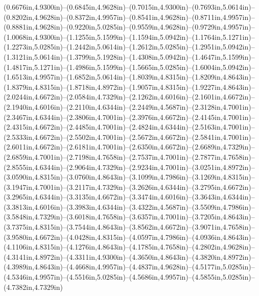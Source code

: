 (0.6676in,4.9300in)--(0.6845in,4.9628in)--(0.7015in,4.9300in)--(0.7693in,5.0614in)--(0.8202in,4.9628in)--(0.8372in,4.9957in)--(0.8541in,4.9628in)--(0.8711in,4.9957in)--(0.8881in,4.9628in)--(0.9220in,5.0285in)--(0.9559in,4.9628in)--(0.9729in,4.9957in)--(1.0068in,4.9300in)--(1.1255in,5.1599in)--(1.1594in,5.0942in)--(1.1764in,5.1271in)--(1.2273in,5.0285in)--(1.2442in,5.0614in)--(1.2612in,5.0285in)--(1.2951in,5.0942in)--(1.3121in,5.0614in)--(1.3799in,5.1928in)--(1.4308in,5.0942in)--(1.4647in,5.1599in)--(1.4817in,5.1271in)--(1.4986in,5.1599in)--(1.5665in,5.0285in)--(1.6004in,5.0942in)--(1.6513in,4.9957in)--(1.6852in,5.0614in)--(1.8039in,4.8315in)--(1.8209in,4.8643in)--(1.8379in,4.8315in)--(1.8718in,4.8972in)--(1.9057in,4.8315in)--(1.9227in,4.8643in)--(2.0244in,4.6672in)--(2.0584in,4.7329in)--(2.1262in,4.6016in)--(2.1601in,4.6672in)--(2.1940in,4.6016in)--(2.2110in,4.6344in)--(2.2449in,4.5687in)--(2.3128in,4.7001in)--(2.3467in,4.6344in)--(2.3806in,4.7001in)--(2.3976in,4.6672in)--(2.4145in,4.7001in)--(2.4315in,4.6672in)--(2.4485in,4.7001in)--(2.4824in,4.6344in)--(2.5163in,4.7001in)--(2.5333in,4.6672in)--(2.5502in,4.7001in)--(2.5672in,4.6672in)--(2.5841in,4.7001in)--(2.6011in,4.6672in)--(2.6181in,4.7001in)--(2.6350in,4.6672in)--(2.6689in,4.7329in)--(2.6859in,4.7001in)--(2.7198in,4.7658in)--(2.7537in,4.7001in)--(2.7877in,4.7658in)--(2.8555in,4.6344in)--(2.9064in,4.7329in)--(2.9234in,4.7001in)--(3.0251in,4.8972in)--(3.0590in,4.8315in)--(3.0760in,4.8643in)--(3.1099in,4.7986in)--(3.1269in,4.8315in)--(3.1947in,4.7001in)--(3.2117in,4.7329in)--(3.2626in,4.6344in)--(3.2795in,4.6672in)--(3.2965in,4.6344in)--(3.3135in,4.6672in)--(3.3474in,4.6016in)--(3.3643in,4.6344in)--(3.3813in,4.6016in)--(3.3983in,4.6344in)--(3.4322in,4.5687in)--(3.5509in,4.7986in)--(3.5848in,4.7329in)--(3.6018in,4.7658in)--(3.6357in,4.7001in)--(3.7205in,4.8643in)--(3.7375in,4.8315in)--(3.7544in,4.8643in)--(3.8562in,4.6672in)--(3.9071in,4.7658in)--(3.9580in,4.6672in)--(4.0428in,4.8315in)--(4.0597in,4.7986in)--(4.0936in,4.8643in)--(4.1106in,4.8315in)--(4.1276in,4.8643in)--(4.1785in,4.7658in)--(4.2802in,4.9628in)--(4.3141in,4.8972in)--(4.3311in,4.9300in)--(4.3650in,4.8643in)--(4.3820in,4.8972in)--(4.3989in,4.8643in)--(4.4668in,4.9957in)--(4.4837in,4.9628in)--(4.5177in,5.0285in)--(4.5346in,4.9957in)--(4.5516in,5.0285in)--(4.5686in,4.9957in)--(4.5855in,5.0285in)--(4.7382in,4.7329in) 